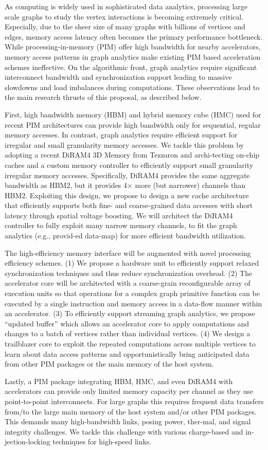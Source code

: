 \noindent
As computing is widely used in sophisticated data analytics, processing large scale graphs to study the vertex interactions is becoming extremely critical. 
Especially, due to the sheer size of many graphs with billions of vertices and edges, memory access latency often becomes the primary performance bottleneck. 
While processing-in-memory (PIM) offer high bandwidth for nearby accelerators, memory access patterns in graph analytics make existing PIM based acceleration schemes ineffective. 
On the algorithmic front, graph analytics require significant interconnect bandwidth and synchronization support leading to massive slowdowns and load imbalances during computations. 
These observations lead to the main research thrusts of this proposal, as described below.
 
First, high bandwidth memory (HBM) and hybrid memory cube (HMC) used for recent PIM architectures can provide high bandwidth only for sequential, regular memory accesses. 
In contrast, graph analytics require efficient support for irregular and small granularity memory accesses. 
We tackle this problem by adopting a recent DiRAM4 3D Memory from Tezzaron and archi-tecting on-chip caches and a custom memory controller to efficiently support small granularity irregular memory accesses. 
Specifically, DiRAM4 provides the same aggregate bandwidth as HBM2, but it provides 4× more (but narrower) channels than HBM2. 
Exploiting this design, we propose to design a new cache architecture that efficiently supports both fine- and coarse-grained data accesses with short latency through spatial voltage boosting. 
We will architect the DiRAM4 controller to fully exploit many narrow memory channels, to fit the graph analytics (e.g., provid-ed data-map) for more efficient bandwidth utilization. 

The high-efficiency memory interface will be augmented with novel processing efficiency schemes. 
(1) We propose a hardware unit to efficiently support relaxed synchronization techniques and thus reduce synchronization overhead. 
(2) The accelerator core will be architected with a coarse-grain reconfigurable array of execution units so that operations for a complex graph primitive function can be executed by a single instruction and memory access in a data-flow manner within an accelerator. 
(3) To efficiently support streaming graph analytics, we propose “updated buffer” which allows an accelerator core to apply computations and changes to a batch of vertices rather than individual vertices. 
(4) We design a trailblazer core to exploit the repeated computations across multiple vertices to learn about data access patterns and opportunistically bring anticipated data from other PIM packages or the main memory of the host system.

Lastly, a PIM package integrating HBM, HMC, and even DiRAM4 with accelerators can provide only limited memory capacity per channel as they use point-to-point interconnects. 
For large graphs this requires frequent data transfers from/to the large main memory of the host system and/or other PIM packages. 
This demands many high-bandwidth links, posing power, ther-mal, and signal integrity challenges. 
We tackle this challenge with various charge-based and in-jection-locking techniques for high-speed links.

